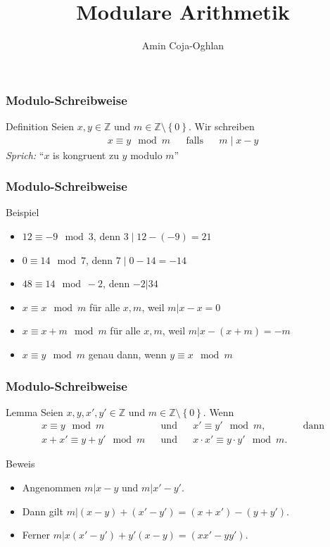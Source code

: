 \documentclass{beamer}
\title[Linadi]{Modulare Arithmetik}
\author[Amin Coja-Oghlan]{Amin Coja-Oghlan}
\institute[Frankfurt]{Goethe Universit\"at Frankfurt}
\date{}
\renewcommand{\emph}[1]{{\textcolor{solarizedRed}{\itshape #1}}}
\newcommand\ZZ{\mathbb Z}
\newcommand\cbc[1]{\left\{{#1}\right\}}
\newcommand{\ue}{\"u}
\begin{document}
\frame[plain]{\titlepage}

\begin{frame}\frametitle{Modulo-Schreibweise}
	\begin{block}{Definition}
		Seien $x,y\in\ZZ$ und $m\in\ZZ\setminus\cbc 0$.
		Wir schreiben
		\begin{align*}
			x\equiv y\mod m&&\mbox{falls}&&m\mid x-y
		\end{align*}
		\emph{Sprich:} ``$x$ is kongruent zu $y$ modulo $m$''
	\end{block}
\end{frame}

\begin{frame}\frametitle{Modulo-Schreibweise}
	\begin{block}{Beispiel}
		\begin{itemize}
			\item $12\equiv -9\mod 3$, denn $3\mid 12-(-9)=21$
			\item $0\equiv 14\mod 7$, denn $7\mid 0-14=-14$
			\item $48\equiv 14\mod -2$, denn $-2|34$
			\item $x\equiv x\mod m$ f\ue r alle $x,m$, weil $m|x-x=0$
			\item $x\equiv x+m\mod m$ f\ue r alle $x,m$, weil $m|x-(x+m)=-m$
			\item $x\equiv y\mod m$ genau dann, wenn $y\equiv x\mod m$
		\end{itemize}
	\end{block}
\end{frame}

\begin{frame}\frametitle{Modulo-Schreibweise}
	\begin{block}{Lemma}
		Seien $x,y,x',y'\in\ZZ$ und $m\in\ZZ\setminus\cbc 0$.
		Wenn
		\begin{align*}
			x\equiv y\mod m&&\mbox{und}&&x'\equiv y'\mod m,&&\mbox{dann}\\
			x+x'\equiv y+y'\mod m&&\mbox{und}&&x\cdot x'\equiv y\cdot y'\mod m.
		\end{align*}
	\end{block}
	\begin{block}{Beweis}
		\begin{itemize}
			\item Angenommen $m|x-y$ und $m|x'-y'$.
			\item Dann gilt $m|(x-y)+(x'-y')=(x+x')-(y+y')$.
			\item Ferner $m|x(x'-y')+y'(x-y)=(xx'-yy')$.
		\end{itemize}	
	\end{block}
\end{frame}
\end{document}
